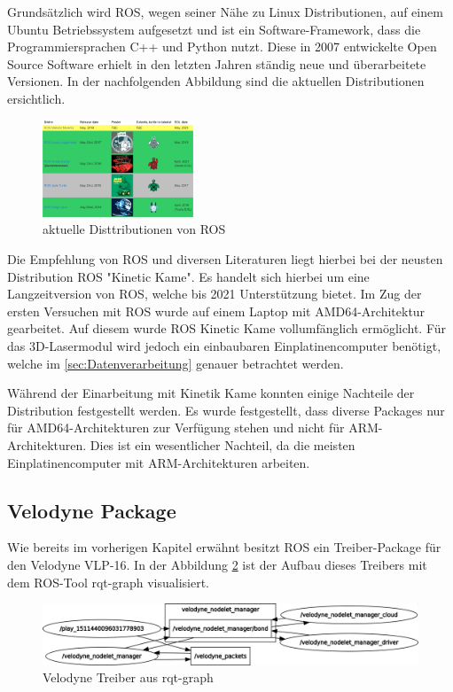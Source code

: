 Grundsätzlich wird \ac{ROS}, wegen seiner Nähe zu Linux Distributionen, auf einem Ubuntu Betriebssystem aufgesetzt und ist ein Software-Framework, dass die Programmiersprachen C++ und Python nutzt. Diese in 2007 entwickelte Open Source Software erhielt in den letzten Jahren ständig neue und überarbeitete Versionen. In der nachfolgenden Abbildung sind die aktuellen Distributionen ersichtlich.

\begin{figure}[H]
	\centering
	\includegraphics[width=0.4\textwidth]{resources/rosdistos.PNG}
	\caption[aktuelle Distributionen von ROS]{aktuelle Disttributionen von ROS {\cite{ROSprojects}}}
	\label{fig:rosdistros}
\end{figure} 

Die Empfehlung von ROS und diversen Literaturen liegt hierbei bei der neusten Distribution ROS "Kinetic Kame". \cite{ROSprojects} Es handelt sich hierbei um eine Langzeitversion von ROS, welche bis 2021 Unterstützung bietet. Im Zug der ersten Versuchen mit ROS wurde auf einem Laptop mit AMD64-Architektur gearbeitet. Auf diesem wurde ROS Kinetic Kame vollumfänglich ermöglicht. Für das 3D-Lasermodul wird jedoch ein einbaubaren Einplatinencomputer benötigt, welche im \ref{sec:Datenverarbeitung} genauer betrachtet werden. 

Während der Einarbeitung mit Kinetik Kame konnten einige Nachteile der Distribution festgestellt werden. Es wurde festgestellt, dass diverse Packages nur für AMD64-Architekturen zur Verfügung stehen und nicht für ARM-Architekturen. Dies ist ein wesentlicher Nachteil, da die meisten Einplatinencomputer mit ARM-Architekturen arbeiten.

\subsection{Velodyne Package}
Wie bereits im vorherigen Kapitel erwähnt besitzt ROS ein Treiber-Package für den Velodyne VLP-16. In der Abbildung \ref{fig:rosgraph} ist der Aufbau dieses Treibers mit dem ROS-Tool rqt-graph visualisiert.

\begin{figure}[H]
	\centering
	\includegraphics[width=1\textwidth]{resources/rosgraph.png}
	\caption[Velodyne Treiber aus rqt-graph ]{Velodyne Treiber aus rqt-graph }
	\label{fig:rosgraph}
\end{figure} 




